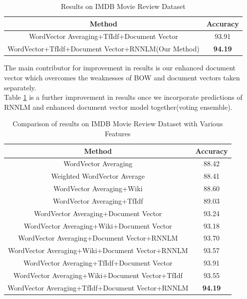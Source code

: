 \documentclass[11pt,a4paper]{article}
\begin{document}
\begin {table}[H]
\centering
\small
\begin{tabular}{ | c | c | }
\hline
\textbf{Method} & \textbf{Accuracy} \\ \hline
WordVector Averaging+TfIdf+Document Vector & 93.91\\ \hline
WordVector+TfIdf+Document Vector+RNNLM(Our Method) & \textbf{94.19}\\ \hline
\end{tabular}
\caption {Results on IMDB Movie Review Dataset}
\label{table:IMDB_rnnlm}
\end{table}

The main contributor for improvement in results is our enhanced document vector which overcomes the weaknesses of BOW and document vectors taken separately.\\
Table \ref{table:IMDB_rnnlm} is a further improvement in results once we incorporate predictions of RNNLM and enhanced document vector model together(voting ensemble).

\begin {table}[H]
\centering
\small
\begin{tabular}{ | c | c | }
\hline
\textbf{Method} & \textbf{Accuracy} \\ \hline
WordVector Averaging & 88.42\\ \hline
Weighted WordVector Average & 88.41\\ \hline
WordVector Averaging+Wiki & 88.60\\ \hline
WordVector Averaging+TfIdf & 89.03\\ \hline
WordVector Averaging+Document Vector & 93.24\\ \hline
WordVector Averaging+Wiki+Document Vector & 93.18\\ \hline
WordVector Averaging+Document Vector+RNNLM & 93.70\\ \hline
WordVector Averaging+Wiki+Document Vector+RNNLM & 93.57\\ \hline
WordVector Averaging+TfIdf+Document Vector & 93.91\\ \hline
WordVector Averaging+Wiki+Document Vector+TfIdf & 93.55\\ \hline
WordVector Averaging+TfIdf+Document Vector+RNNLM & \textbf{94.19}\\ \hline
\end{tabular}
\caption {Comparison of results on IMDB Movie Review Dataset with Various Features}
\label{table:IMDB_features}
\end{table}
\end{document}
